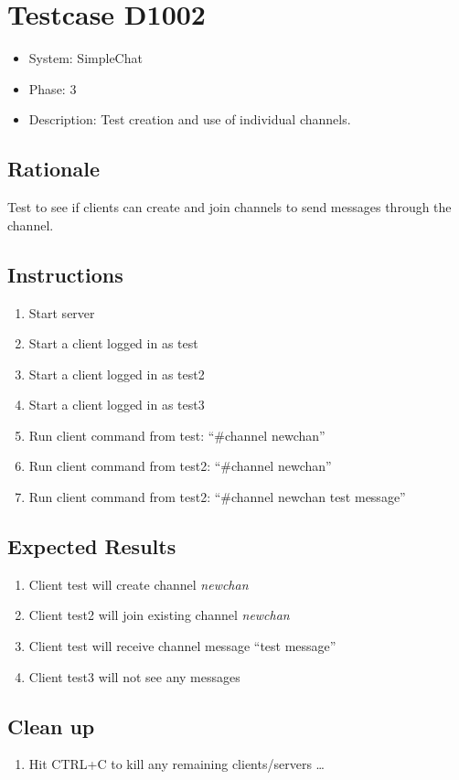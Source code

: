 \documentclass[12pt]{article}
\begin{document}
\section{Testcase D1002}
\begin{itemize}
\item System: SimpleChat
\item Phase: 3
\item Description: Test creation and use of individual channels.
\end{itemize}

\subsection*{Rationale}
Test to see if clients can create and join channels to send messages through the channel.

\subsection*{Instructions}
\begin{enumerate}
\item Start server
\item Start a client logged in as test
\item Start a client logged in as test2
\item Start a client logged in as test3
\item Run client command from test: ``\#channel newchan''
\item Run client command from test2: ``\#channel newchan''
\item Run client command from test2: ``\#channel newchan test message''
\end{enumerate}

\subsection*{Expected Results}
\begin{enumerate}
\item Client test will create channel \emph{newchan}
\item Client test2 will join existing channel \emph{newchan}
\item Client test will receive channel message ``test message''
\item Client test3 will not see any messages
\end{enumerate}

\subsection*{Clean up}
\begin{enumerate}
\item Hit CTRL+C to kill any remaining clients/servers \dots
\end{enumerate}
\end{document}
